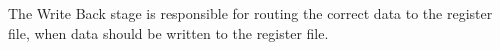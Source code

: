 The Write Back stage is responsible for routing the correct data to the register file, when data should be written to the register file.

